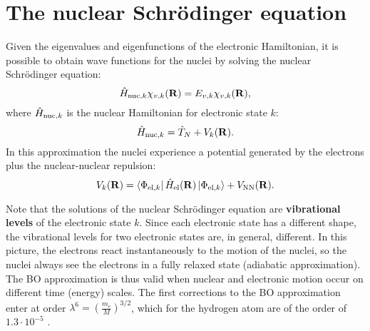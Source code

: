 \documentclass[../Main/chem532-notes.tex]{subfiles}
\begin{document}
\section{The nuclear Schr\"{o}dinger equation}
Given the eigenvalues and eigenfunctions of the electronic Hamiltonian, it is possible to obtain wave functions for the nuclei by solving the nuclear Schr\"{o}dinger equation:
\begin{equation}
\hat{H}_{{\rm nuc},k} \chi_{v,k}(\mathbf{R}) =  E_{v,k} \chi_{v,k}(\mathbf{R}),
\end{equation}
where $\hat{H}_{{\rm nuc},k}$ is the nuclear Hamiltonian for electronic state $k$:
\begin{equation}
\hat{H}_{{\rm nuc},k} = \hat{T}_{N} + V_{k}(\mathbf{R}).
\end{equation}
In this approximation the nuclei experience a potential generated by the electrons plus the nuclear-nuclear repulsion:
\begin{equation}
V_{k}(\mathbf{R}) = \bra{\Phi_{\mathrm{el},k}}\hat{H}_\mathrm{el}(\mathbf{R}) \ket{\Phi_{\mathrm{el},k}} + V_\mathrm{NN}(\mathbf{R}).
\end{equation}

Note that the solutions of the nuclear Schr\"{o}dinger equation are \textbf{vibrational levels} of the electronic state $k$.
Since each electronic state has a different shape, the vibrational levels for two electronic states are, in general, different.
In this picture, the electrons react instantaneously to the motion of the nuclei, so the nuclei always see the electrons in a fully relaxed state (adiabatic approximation).
The BO approximation is thus valid when nuclear and electronic motion occur on different time (energy) scales.
The first corrections to the BO approximation enter at order $\lambda^6 = \left( \frac{m_e}{M} \right)^{3/2}$, which for the hydrogen atom are of the order of $1.3 \cdot 10^{-5}$ \Eh.
\end{document}
